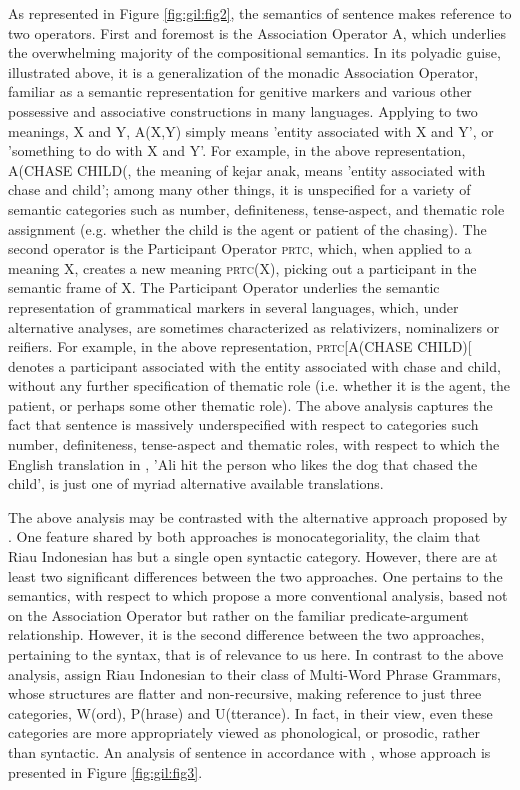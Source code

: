 \documentclass[output=paper,colorlinks,citecolor=brown
]{langscibook}
\begin{document}
As represented in Figure \ref{fig:gil:fig2}, the semantics of sentence  makes reference to two operators. First and foremost is the Association Operator A, which underlies the overwhelming majority of the compositional semantics. In its polyadic guise, illustrated above, it is a generalization of the monadic Association Operator, familiar as a semantic representation for genitive markers and various other possessive and associative constructions in many languages. Applying to two meanings, X and Y, A(X,Y) simply means 'entity associated with X and Y', or 'something to do with X and Y'. For example, in the above representation, A(CHASE CHILD(, the meaning of kejar anak, means 'entity associated with chase and child'; among many other things, it is unspecified for a variety of semantic categories such as number, definiteness, tense-aspect, and thematic role assignment (e.g. whether the child is the agent or patient of the chasing). The second operator is the Participant Operator \textsc{prtc}, which, when applied to a meaning X, creates a new meaning \textsc{prtc}(X), picking out a participant in the semantic frame of X. The Participant Operator underlies the semantic representation of grammatical markers in several languages, which, under alternative analyses, are sometimes characterized as relativizers, nominalizers or reifiers. For example, in the above representation, \textsc{prtc}[A(CHASE CHILD)[ denotes a participant associated with the entity associated with chase and child, without any further specification of thematic role (i.e. whether it is the agent, the patient, or perhaps some other thematic role). The above analysis captures the fact that sentence  is massively underspecified with respect to categories such number, definiteness, tense-aspect and thematic roles, with respect to which the English translation in , 'Ali hit the person who likes the dog that chased the child', is just one of myriad alternative available translations.

The above analysis may be contrasted with the alternative approach proposed by \citet{jackendoff2014syntax,jackendoff2017linear}. One feature shared by both approaches is monocategoriality, the claim that Riau Indonesian has but a single open syntactic category.  However, there are at least two significant differences between the two approaches.  One pertains to the semantics, with respect to which \citet{jackendoff2014syntax,jackendoff2017linear} propose a more conventional analysis, based not on the Association Operator but rather on the familiar predicate-argument relationship.  However, it is the second difference between the two approaches, pertaining to the syntax, that is of relevance to us here.  In contrast to the above analysis, \citet{jackendoff2014syntax,jackendoff2017linear} assign Riau Indonesian to their class of Multi-Word Phrase Grammars, whose structures are flatter and non-recursive, making reference to just three categories, W(ord), P(hrase) and U(tterance).  In fact, in their view, even these categories are more appropriately viewed as phonological, or prosodic, rather than syntactic.  An analysis of sentence  in accordance with \citet{jackendoff2014syntax,jackendoff2017linear}, whose approach is presented in Figure \ref{fig:gil:fig3}.
\end{document}
